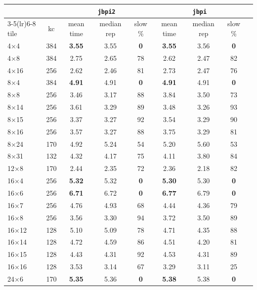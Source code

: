 \documentclass[10pt,a4paper]{article}
\newcommand{\up}[1]{\textcolor{red!70!black}{#1}}
\newcommand{\good}[1]{\textcolor{green!45!black}{\textbf{#1}}}
\begin{document}
\begin{center}\footnotesize\setlength{\tabcolsep}{4pt}
\begin{tabular}{@{}lcccccccc@{}}
\toprule
 & & \multicolumn{3}{c}{\texttt{jbpi2}} & \multicolumn{3}{c}{\texttt{jbpi}} \\
\cmidrule(lr){3-5}\cmidrule(lr){6-8}
tile & kc & mean time & median rep & slow \% & mean time & median rep & slow \% \\
\midrule
4$\times$4 & 384 & \good{3.55} & 3.55 & \good{0} & \good{3.55} & 3.56 & \good{0} \\
4$\times$8 & 384 & 2.75 & 2.65 & \up{78} & 2.62 & 2.47 & \up{82} \\
4$\times$16 & 256 & 2.62 & 2.46 & \up{81} & 2.73 & 2.47 & \up{76} \\
8$\times$4 & 384 & \good{4.91} & 4.91 & \good{0} & \good{4.91} & 4.91 & \good{0} \\
8$\times$8 & 256 & 3.46 & 3.17 & \up{88} & 3.84 & 3.50 & \up{73} \\
8$\times$14 & 256 & 3.61 & 3.29 & \up{89} & 3.48 & 3.26 & \up{93} \\
8$\times$15 & 256 & 3.37 & 3.27 & \up{92} & 3.54 & 3.29 & \up{90} \\
8$\times$16 & 256 & 3.57 & 3.27 & \up{88} & 3.75 & 3.29 & \up{81} \\
8$\times$24 & 170 & 4.92 & 5.24 & \up{54} & 5.20 & 5.60 & \up{53} \\
8$\times$31 & 132 & 4.32 & 4.17 & \up{75} & 4.11 & 3.80 & \up{84} \\
12$\times$8 & 170 & 2.44 & 2.35 & \up{72} & 2.36 & 2.18 & \up{82} \\
16$\times$4 & 256 & \good{5.32} & 5.32 & \good{0} & \good{5.30} & 5.30 & \good{0} \\
16$\times$6 & 256 & \good{6.71} & 6.72 & \good{0} & \good{6.77} & 6.79 & \good{0} \\
16$\times$7 & 256 & 4.76 & 4.93 & \up{68} & 4.44 & 4.36 & \up{79} \\
16$\times$8 & 256 & 3.56 & 3.30 & \up{94} & 3.72 & 3.50 & \up{89} \\
16$\times$12 & 128 & 5.10 & 5.09 & \up{78} & 4.71 & 4.35 & \up{88} \\
16$\times$14 & 128 & 4.72 & 4.59 & \up{86} & 4.51 & 4.20 & \up{81} \\
16$\times$15 & 128 & 4.43 & 4.31 & \up{92} & 4.53 & 4.31 & \up{89} \\
16$\times$16 & 128 & 3.53 & 3.14 & \up{67} & 3.29 & 3.11 & 25 \\
24$\times$6 & 170 & \good{5.35} & 5.36 & \good{0} & \good{5.38} & 5.38 & \good{0} \\

\end{tabular}
\end{center}
\end{document}
